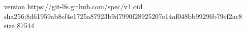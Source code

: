 version https://git-lfs.github.com/spec/v1
oid sha256:8d61959ab8ef4e1725a87923b9d7990f28925207e14af048bb99296b79ef2ac8
size 87544
